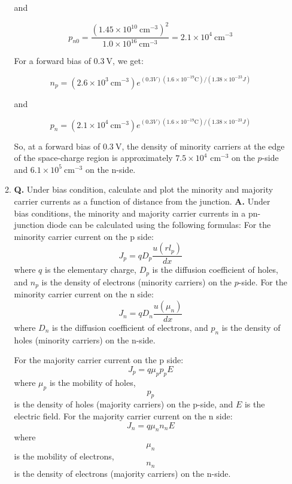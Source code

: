 \documentclass[main.tex]{subfiles}
\begin{document}
\begin{enumerate}
\begin{enumerate}
        and
        
        $$
        p_{n 0}=\frac{\left(1.45 \times 10^{10} \mathrm{~cm}^{-3}\right)^2}{1.0 \times 10^{16} \mathrm{~cm}^{-3}}=2.1 \times 10^4 \mathrm{~cm}^{-3}
        $$
        
        For a forward bias of $0.3 \mathrm{~V}$, we get:
        
        $$
        n_p=\left(2.6 \times 10^3 \mathrm{~cm}^{-3}\right) e^{(0.3 V)\left(1.6 \times 10^{-19} \mathrm{C}\right) /\left(1.38 \times 10^{-23} J\right)}
        $$
        
        and
        
        $$
        p_n=\left(2.1 \times 10^4 \mathrm{~cm}^{-3}\right) e^{(0.3 V)\left(1.6 \times 10^{-19} \mathrm{C}\right) /\left(1.38 \times 10^{-23} J\right)}
        $$
        
        So, at a forward bias of $0.3 \mathrm{~V}$, the density of minority carriers at the edge of the space-charge region is approximately $7.5 \times 10^{4}$ $\mathrm{cm}^{-3}$ on the $p$-side and $6.1 \times 10^{5} \mathrm{~cm}^{-3}$ on the n-side.
        
        \item \textbf{Q.} Under bias condition, calculate and plot the minority and majority carrier currents as a function of distance from the junction. \textbf{A.} Under bias conditions, the minority and majority carrier currents in a pn-junction diode can be calculated using the following formulas:
        For the minority carrier current on the $\mathrm{p}$ side:
        $$
        J_p=q D_p \frac{u\left(r l_p\right)}{d x}
        $$
        where
        $q$
        is the elementary charge,
        $D_p$
        is the diffusion coefficient of holes, and
        $n_p$
        is the density of electrons (minority carriers) on the $p$-side.
        For the minority carrier current on the $\mathrm{n}$ side:
        $$
        J_n=q D_n \frac{u\left(\mu_n\right)}{d x}
        $$
        where
        $D_n$
        is the diffusion coefficient of electrons, and
        $p_n$
        is the density of holes (minority carriers) on the $\mathrm{n}$-side.
        
        For the majority carrier current on the $\mathrm{p}$ side:
        $$
        J_p=q \mu_p p_p E
        $$
        where
        $\mu_p$
        is the mobility of holes,
        $$
        p_p
        $$
        is the density of holes (majority carriers) on the p-side, and
        $E$ is the electric field.
        For the majority carrier current on the $\mathrm{n}$ side:
        $$
        J_n=q \mu_n n_n E
        $$
        where
        $$
        \mu_n
        $$
        is the mobility of electrons,
        $$
        n_n
        $$
        is the density of electrons (majority carriers) on the $\mathrm{n}$-side.
    \end{enumerate}

\end{enumerate}
\end{document}
